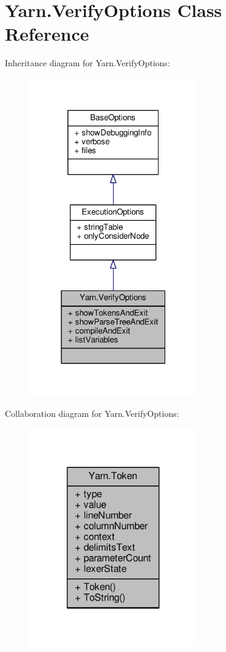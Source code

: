 \hypertarget{a00169}{\section{Yarn.\-Verify\-Options Class Reference}
\label{a00169}
}


Inheritance diagram for Yarn.\-Verify\-Options\-:
\nopagebreak
\begin{figure}[H]
\begin{center}
\leavevmode
\includegraphics[width=208pt]{a00648}
\end{center}
\end{figure}


Collaboration diagram for Yarn.\-Verify\-Options\-:
\nopagebreak
\begin{figure}[H]
\begin{center}
\leavevmode
\includegraphics[width=208pt]{a00649}
\end{center}
\end{figure}
